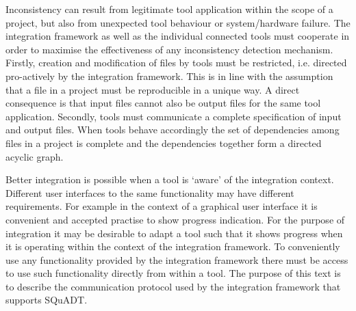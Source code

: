 \documentclass{article}
\newcommand{\squadt}{SQuADT\xspace}
\begin{document}
  Inconsistency can result from legitimate tool application within the scope of
  a project, but also from unexpected tool behaviour or system/hardware
  failure.  The integration framework as well as the individual connected tools
  must cooperate in order to maximise the effectiveness of any inconsistency
  detection mechanism. Firstly, creation and modification of files by tools must be
  restricted, i.e. directed pro-actively by the integration framework.  This is
  in line with the assumption that a file in a project must be reproducible in
  a unique way. A direct consequence is that input files cannot also be output
  files for the same tool application.  Secondly, tools must communicate a
  complete specification of input and output files.  When tools behave
  accordingly the set of dependencies among files in a project is complete and
  the dependencies together form a directed acyclic graph.
 
  Better integration is possible when a tool is `aware' of the integration
  context. Different user interfaces to the same functionality may have different
  requirements. For example in the context of a graphical user interface it is
  convenient and accepted practise to show progress indication. For the purpose
  of integration it may be desirable to adapt a tool such that it shows
  progress when it is operating within the context of the integration
  framework. To conveniently use any functionality provided by the integration
  framework there must be access to use such functionality directly from
  within a tool.  The purpose of this text is to describe the communication
  protocol used by the integration framework that supports \squadt.

\end{document}
